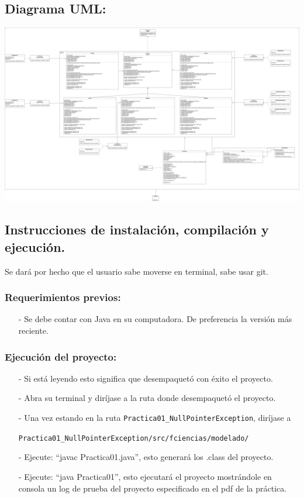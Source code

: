 \documentclass{article}
\newcommand{\code}[1]{\textcolor{white!25!black}{\texttt{#1}}}
\begin{document}
\subsection*{Diagrama UML:}
\includegraphics[scale=0.10]{./Practica01UML.png}

\subsection*{Instrucciones de instalación, compilación y ejecución.}
Se dará por hecho que el usuario sabe moverse en terminal, sabe usar git.\\

\subsubsection*{Requerimientos previos:}
\begin{itemize}
\item[-] Se debe contar con Java en su computadora. De preferencia la versión más reciente.
\end{itemize}

\subsubsection*{Ejecución del proyecto:}
\begin{itemize}
\item[-] Si está leyendo esto significa que desempaquetó con éxito el proyecto.
\item[-] Abra su terminal y diríjase a la ruta donde desempaquetó el proyecto.
\item[-] Una vez estando en la ruta \code{Practica01\_NullPointerException}, diríjase a

  \code{Practica01\_NullPointerException/src/fciencias/modelado/}
\item[-] Ejecute: “javac Practica01.java”, esto generará los .class del proyecto.
\item[-] Ejecute: “java Practica01”, esto ejecutará el proyecto mostrándole
 en consola un log de prueba del proyecto especificado en el pdf de la práctica.
\end{itemize}
\end{document}
